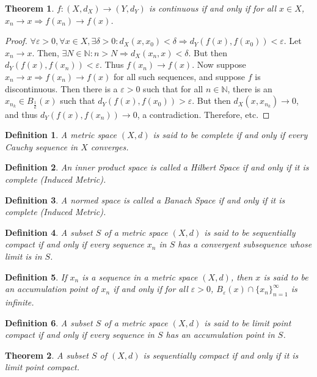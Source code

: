 \documentclass[crop=false,class=book]{standalone}
\theoremstyle{mystyle}
\newtheorem{theorem}{Theorem}[section]
\newtheorem{definition}{Definition}[section]
\begin{document}
\begin{theorem}
$f:(X,d_X)\rightarrow (Y,d_Y)$ is continuous if and only if for all $x\in X$, $x_n\rightarrow x \Rightarrow f(x_n)\rightarrow f(x)$.
\end{theorem}
\begin{proof}
$\forall \varepsilon>0,\forall x\in X,\exists \delta>0:d_X(x,x_0)<\delta \Rightarrow d_Y(f(x),f(x_0))<\varepsilon$. Let $x_n \rightarrow x$. Then, $\exists N\in \mathbb{N}:n>N \Rightarrow d_X(x_n,x)<\delta$. But then $d_Y(f(x),f(x_n)) < \varepsilon$. Thus $f(x_n)\rightarrow f(x)$. Now suppose $x_n\rightarrow x \Rightarrow f(x_n)\rightarrow f(x)$ for all such sequences, and suppose $f$ is discontinuous. Then there is a $\varepsilon>0$ such that for all $n\in \mathbb{N}$, there is an $x_{n_k} \in B_{\frac{1}{k}}(x)$ such that $d_Y(f(x),f(x_0))>\varepsilon$. But then $d_X(x,x_{n_k})\rightarrow 0$, and thus $d_Y(f(x),f(x_n))\rightarrow 0$, a contradiction. Therefore, etc.
\end{proof}
\begin{definition}
A metric space $(X,d)$ is said to be complete if and only if every Cauchy sequence in $X$ converges.
\end{definition}
\begin{definition}
An inner product space is called a Hilbert Space if and only if it is complete (Induced Metric).
\end{definition}
\begin{definition}
A normed space is called a Banach Space if and only if it is complete (Induced Metric).
\end{definition}
\begin{definition}
A subset $S$ of a metric space $(X,d)$ is said to be sequentially compact if and only if every sequence $x_n$ in $S$ has a convergent subsequence whose limit is in $S$.
\end{definition}
\begin{definition}
If $x_n$ is a sequence in a metric space $(X,d)$, then $x$ is said to be an accumulation point of $x_n$ if and only if for all $\varepsilon>0$, $B_{\varepsilon}(x)\cap \{x_n\}_{n=1}^{\infty}$ is infinite.
\end{definition}
\begin{definition}
A subset $S$ of a metric space $(X,d)$ is said to be limit point compact if and only if every sequence in $S$ has an accumulation point in $S$.
\end{definition}
\begin{theorem}
A subset $S$ of $(X,d)$ is sequentially compact if and only if it is limit point compact.
\end{theorem}
\end{document}
